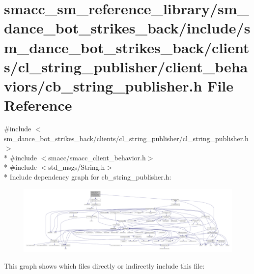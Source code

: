 \hypertarget{strikes__back_2include_2sm__dance__bot__strikes__back_2clients_2cl__string__publisher_2client__b6092546a14189497fb33fc7e70b5eb23}{}\section{smacc\+\_\+sm\+\_\+reference\+\_\+library/sm\+\_\+dance\+\_\+bot\+\_\+strikes\+\_\+back/include/sm\+\_\+dance\+\_\+bot\+\_\+strikes\+\_\+back/clients/cl\+\_\+string\+\_\+publisher/client\+\_\+behaviors/cb\+\_\+string\+\_\+publisher.h File Reference}
\label{strikes__back_2include_2sm__dance__bot__strikes__back_2clients_2cl__string__publisher_2client__b6092546a14189497fb33fc7e70b5eb23}
{\ttfamily \#include $<$sm\+\_\+dance\+\_\+bot\+\_\+strikes\+\_\+back/clients/cl\+\_\+string\+\_\+publisher/cl\+\_\+string\+\_\+publisher.\+h$>$}\\*
{\ttfamily \#include $<$smacc/smacc\+\_\+client\+\_\+behavior.\+h$>$}\\*
{\ttfamily \#include $<$std\+\_\+msgs/\+String.\+h$>$}\\*
Include dependency graph for cb\+\_\+string\+\_\+publisher.\+h\+:
\nopagebreak
\begin{figure}[H]
\begin{center}
\leavevmode
\includegraphics[width=350pt]{strikes__back_2include_2sm__dance__bot__strikes__back_2clients_2cl__string__publisher_2client__bf8ef1cec184071902e116df5c9c999a1}
\end{center}
\end{figure}
This graph shows which files directly or indirectly include this file\+:
\nopagebreak
